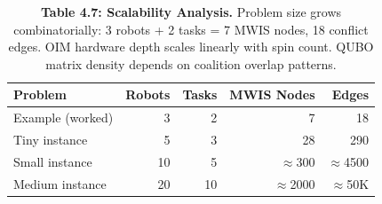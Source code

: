\begin{table}[H]
\centering
\caption{\textbf{Table 4.7: Scalability Analysis.} Problem size grows combinatorially: 3 robots + 2 tasks = 7 MWIS nodes, 18 conflict edges. OIM hardware depth scales linearly with spin count. QUBO matrix density depends on coalition overlap patterns.}
\label{tab:4-7}
\small
\begin{tabular}{lrrrr}
\toprule
\textbf{Problem} & \textbf{Robots} & \textbf{Tasks} & \textbf{MWIS Nodes} & \textbf{Edges} \\
\midrule
\rowcolor{gray!15}
Example (worked) & 3 & 2 & 7 & 18 \\
Tiny instance & 5 & 3 & 28 & 290 \\
\rowcolor{gray!15}
Small instance & 10 & 5 & $\approx$300 & $\approx$4500 \\
Medium instance & 20 & 10 & $\approx$2000 & $\approx$50K \\
\bottomrule
\end{tabular}
\end{table}
